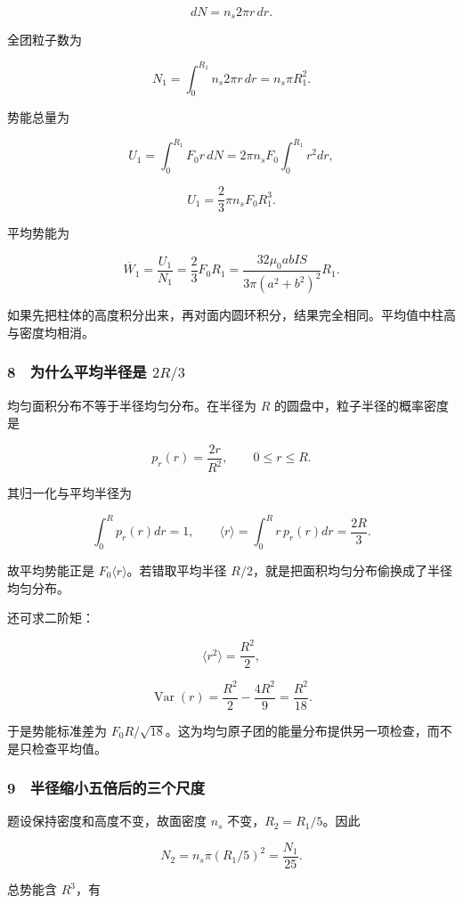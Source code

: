 \documentclass[12pt,a4paper,fontset=fandol]{ctexart}
\begin{document}
\[dN=n_s2\pi r\,dr.\]

全团粒子数为

\[\boxed{N_1=\int_0^{R_1}n_s2\pi r\,dr
=n_s\pi R_1^2.}\]

势能总量为

\[U_1=\int_0^{R_1}F_0r\,dN
=2\pi n_sF_0\int_0^{R_1}r^2dr,\]

\[\boxed{U_1=\frac23\pi n_sF_0R_1^3.}\]

平均势能为

\[\boxed{\overline W_1=\frac{U_1}{N_1}
=\frac23F_0R_1
=\frac{32\mu_0abIS}{3\pi(a^2+b^2)^2}R_1.}\]

如果先把柱体的高度积分出来，再对面内圆环积分，结果完全相同。平均值中柱高与密度均相消。

\subsubsection{\texorpdfstring{8　为什么平均半径是
\(2R/3\)}{8　为什么平均半径是 2R/3}}\label{ux4e3aux4ec0ux4e48ux5e73ux5747ux534aux5f84ux662f-2r3}

均匀面积分布不等于半径均匀分布。在半径为 \(R\)
的圆盘中，粒子半径的概率密度是

\[p_r(r)=\frac{2r}{R^2},\qquad0\le r\le R.\]

其归一化与平均半径为

\[\int_0^Rp_r(r)dr=1,
\qquad\langle r\rangle=\int_0^Rr\,p_r(r)dr=\frac{2R}{3}.\]

故平均势能正是 \(F_0\langle r\rangle\)。若错取平均半径
\(R/2\)，就是把面积均匀分布偷换成了半径均匀分布。

还可求二阶矩：

\[\langle r^2\rangle=\frac{R^2}{2},\]

\[\operatorname{Var}(r)=\frac{R^2}{2}-\frac{4R^2}{9}
=\frac{R^2}{18}.\]

于是势能标准差为
\(F_0R/\sqrt{18}\)。这为均匀原子团的能量分布提供另一项检查，而不是只检查平均值。

\subsubsection{9　半径缩小五倍后的三个尺度}\label{ux534aux5f84ux7f29ux5c0fux4e94ux500dux540eux7684ux4e09ux4e2aux5c3aux5ea6}

题设保持密度和高度不变，故面密度 \(n_s\) 不变，\(R_2=R_1/5\)。因此

\[\boxed{N_2=n_s\pi(R_1/5)^2=\frac{N_1}{25}.}\]

总势能含 \(R^3\)，有
\end{document}
